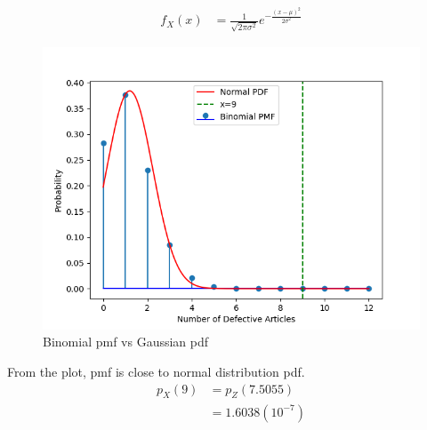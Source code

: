 \documentclass[journal,12pt,twocolumn]{IEEEtran}
\theoremstyle{remark}
\begin{document}
\begin{align}
f_X(x)&=\frac{1}{\sqrt{2\pi\sigma^2}}e^{-\frac{(x-\mu)^2}{2\sigma^2}}
\end{align}
\begin{figure}[!ht]
\centering
\includegraphics[width=\columnwidth]{figs/figure.png}
\caption{Binomial pmf vs Gaussian pdf }
\label{fig:Triangle}
\end{figure}
From the plot, pmf is close to normal distribution pdf.
\begin{align}
p_X(9)&=p_Z(7.5055)\\
&=1.6038(10^{-7})
\end{align}
\end{document}
